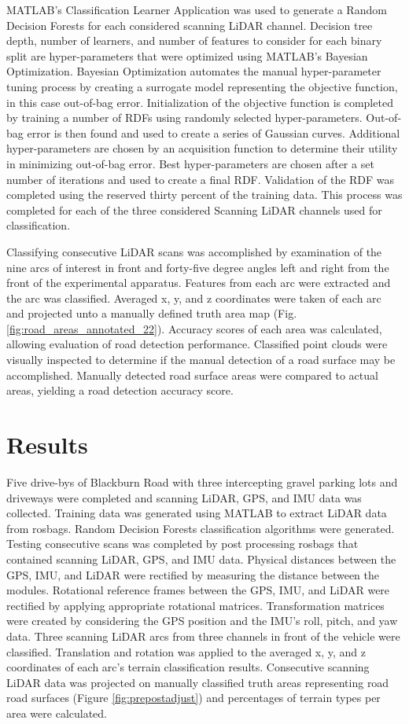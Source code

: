 \documentclass[balance,upint,subscriptcorrection,varvw,mathalfa=cal=boondoxo,colorlinks]{asmeconf}
\begin{document}
	{MATLAB's Classification Learner Application was used to generate a Random Decision Forests for each considered scanning LiDAR channel. Decision tree depth, number of learners, and number of features to consider for each binary split are hyper-parameters that were optimized using MATLAB's Bayesian Optimization. Bayesian Optimization automates the manual hyper-parameter tuning process by creating a surrogate model representing the objective function, in this case out-of-bag error. Initialization of the objective function is completed by training a number of RDFs using randomly selected hyper-parameters. Out-of-bag error is then found and used to create a series of Gaussian curves. Additional hyper-parameters are chosen by an acquisition function to determine their utility in minimizing out-of-bag error. Best hyper-parameters are chosen after a set number of iterations and used to create a final RDF. Validation of the RDF was completed using the reserved thirty percent of the training data. This process was completed for each of the three considered Scanning LiDAR channels used for classification.}
	
	{Classifying consecutive LiDAR scans was accomplished by examination of the nine arcs of interest in front and forty-five degree angles left and right from the front of the experimental apparatus. Features from each arc were extracted and the arc was classified. Averaged x, y, and z coordinates were taken of each arc and projected unto a manually defined truth area map (Fig. \ref{fig:road_areas_annotated_22}). Accuracy scores of each area was calculated, allowing evaluation of road detection performance. Classified point clouds were visually inspected to determine if the manual detection of a road surface may be accomplished. Manually detected road surface areas were compared to actual areas, yielding a road detection accuracy score. }

\section{Results}
	
	{Five drive-bys of Blackburn Road with three intercepting gravel parking lots and driveways were completed and scanning LiDAR, GPS, and IMU data was collected. Training data was generated using MATLAB to extract LiDAR data from rosbags. Random Decision Forests classification algorithms were generated. Testing consecutive scans was completed by post processing rosbags that contained scanning LiDAR, GPS, and IMU data. Physical distances between the GPS, IMU, and LiDAR were rectified by measuring the distance between the modules. Rotational reference frames between the GPS, IMU, and LiDAR were rectified by applying appropriate rotational matrices. Transformation matrices were created by considering the GPS position and the IMU's roll, pitch, and yaw data. Three scanning LiDAR arcs from three channels in front of the vehicle were classified. Translation and rotation was applied to the averaged x, y, and z coordinates of each arc's terrain classification results. Consecutive scanning LiDAR data was projected on manually classified truth areas representing road road surfaces (Figure \ref{fig:prepostadjust}) and percentages of terrain types per area were calculated.}
	
\end{document}
